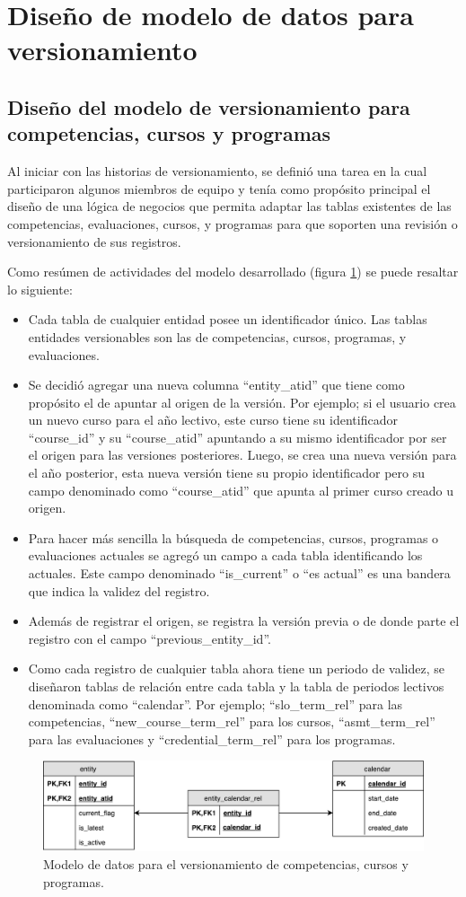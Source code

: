\section{Diseño de modelo de datos para versionamiento}
\subsection{Diseño del modelo de versionamiento para competencias, cursos y programas}
Al iniciar con las historias de versionamiento, se definió una tarea en la cual participaron algunos miembros de equipo y tenía como propósito principal el diseño de una lógica de negocios que permita adaptar las tablas existentes de las competencias, evaluaciones, cursos, y programas para que soporten una revisión o versionamiento de sus registros.

Como resúmen de actividades del modelo desarrollado (figura \ref{version_model}) se puede resaltar lo siguiente:
\begin{itemize}
	\item Cada tabla de cualquier entidad posee un identificador único. Las tablas entidades versionables son las de competencias, cursos, programas, y evaluaciones.
	\item Se decidió agregar una nueva columna \enquote{entity_atid} que tiene como propósito el de apuntar al origen de la versión. Por ejemplo; si el usuario crea un nuevo curso para el año lectivo, este curso tiene su identificador \enquote{course_id} y su \enquote{course_atid} apuntando a su mismo identificador por ser el origen para las versiones posteriores. Luego, se crea una nueva versión para el año posterior, esta nueva versión tiene su propio identificador pero su campo denominado como \enquote{course_atid} que apunta al primer curso creado u origen.
	\item Para hacer más sencilla la búsqueda de competencias, cursos, programas o evaluaciones actuales se agregó un campo a cada tabla identificando los actuales. Este campo denominado \enquote{is_current} o “es actual” es una bandera que indica la validez del registro.
	\item Además de registrar el origen, se registra la versión previa o de donde parte el registro con el campo \enquote{previous_entity_id}.
	\item Como cada registro de cualquier tabla ahora tiene un periodo de validez, se diseñaron tablas de relación entre cada tabla y la tabla de periodos lectivos denominada como \enquote{calendar}. Por ejemplo; \enquote{slo_term_rel} para las competencias, \enquote{new_course_term_rel} para los cursos, \enquote{asmt_term_rel} para las evaluaciones y \enquote{credential_term_rel} para los programas.
\end{itemize}

\begin{figure}
\centering
\includegraphics[width=125mm,scale=1]{Capitulos/DesarrollodelaAplicacion/Imagenes/version_model}
\caption{Modelo de datos para el versionamiento de competencias, cursos y programas.}
  \label{version_model}
\end{figure}